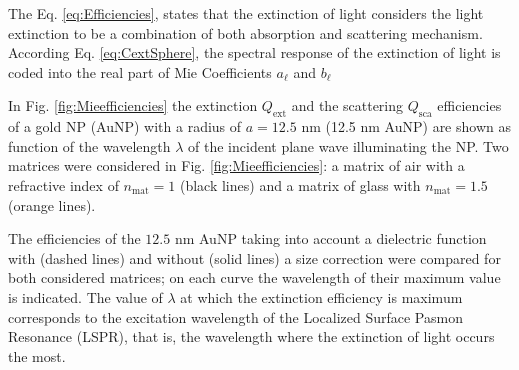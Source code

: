 The Eq. \eqref{eq:Efficiencies}, states that the extinction of light considers  the light extinction to be a combination of both absorption and scattering mechanism. According Eq. \eqref{eq:CextSphere}, the spectral response of the extinction of light is coded into the real part of Mie Coefficients $a_\ell$ and $b_\ell$ {}


In Fig. \ref{fig:Mieefficiencies} the extinction  $Q_\text{ext}$ and the scattering  $Q_\text{sca}$ efficiencies of a gold NP (AuNP) with a radius of $a = 12.5$ nm (12.5 nm AuNP) are shown as function of the wavelength $\lambda$ of the incident plane wave illuminating the NP. Two matrices were considered in Fig. \ref{fig:Mieefficiencies}: a matrix of air with a refractive index of $n_\text{mat} = 1$ (black lines) and a matrix of glass with $n_\text{mat} = 1.5$ (orange lines).


 The efficiencies of the $12.5$ nm AuNP  taking into account a dielectric function with (dashed lines) and without (solid lines) a size correction were compared for both considered matrices; on each curve the wavelength of their maximum value is indicated. The value of $\lambda$ at which the extinction efficiency is maximum corresponds to the excitation wavelength of the Localized Surface Pasmon Resonance (LSPR), that is, the wavelength where the extinction of light occurs the most.


